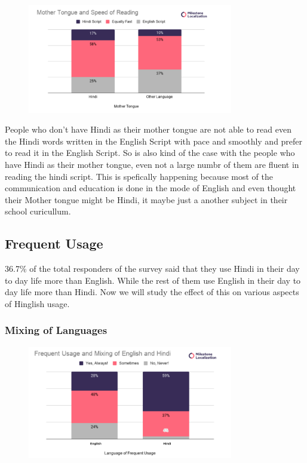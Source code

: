 \documentclass{article}
\begin{document}
\begin{figure}[H]
    \centering
    \includegraphics[width=0.8\textwidth]{plots/mother_faster_read.png}
\end{figure}
People who don't have Hindi as their mother tongue are not able to read even the Hindi words written in the English Script with pace and smoothly and prefer to read it in the English Script. So is also kind of the case with the people who have Hindi as their mother tongue, even not a large numbr of them are fluent in reading the hindi script. This is spefically happening because most of the communication and education is done in the mode of English and even thought their Mother tongue might be Hindi, it maybe just a another subject in their school curicullum.

\subsection{Frequent Usage}
36.7\% of the total responders of the survey said that they use Hindi in their day to day life more than English. While the rest of them use English in their day to day life more than Hindi. Now we will study the effect of this on various aspects of Hinglish usage.

\subsubsection{Mixing of Languages}

\begin{figure}[H]
    \centering
    \includegraphics[width=0.8\textwidth]{plots/frequent_mixing_language.png}
\end{figure}
\end{document}
